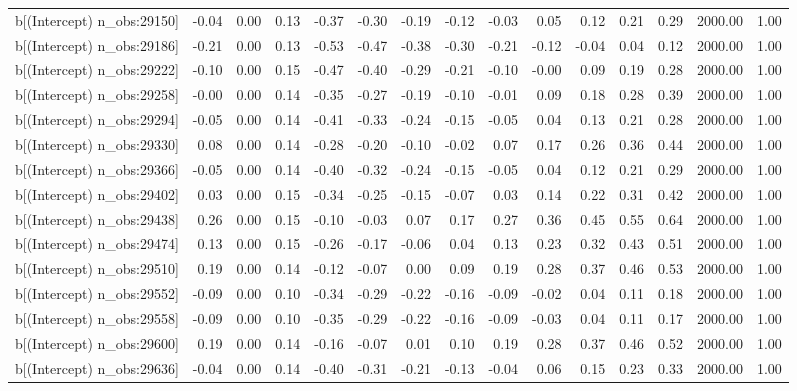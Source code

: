 \begin{table}[ht]
\begin{tabular}{rrrrrrrrrrrrrrr}
  b[(Intercept) n\_obs:29150] & -0.04 & 0.00 & 0.13 & -0.37 & -0.30 & -0.19 & -0.12 & -0.03 & 0.05 & 0.12 & 0.21 & 0.29 & 2000.00 & 1.00 \\ 
  b[(Intercept) n\_obs:29186] & -0.21 & 0.00 & 0.13 & -0.53 & -0.47 & -0.38 & -0.30 & -0.21 & -0.12 & -0.04 & 0.04 & 0.12 & 2000.00 & 1.00 \\ 
  b[(Intercept) n\_obs:29222] & -0.10 & 0.00 & 0.15 & -0.47 & -0.40 & -0.29 & -0.21 & -0.10 & -0.00 & 0.09 & 0.19 & 0.28 & 2000.00 & 1.00 \\ 
  b[(Intercept) n\_obs:29258] & -0.00 & 0.00 & 0.14 & -0.35 & -0.27 & -0.19 & -0.10 & -0.01 & 0.09 & 0.18 & 0.28 & 0.39 & 2000.00 & 1.00 \\ 
  b[(Intercept) n\_obs:29294] & -0.05 & 0.00 & 0.14 & -0.41 & -0.33 & -0.24 & -0.15 & -0.05 & 0.04 & 0.13 & 0.21 & 0.28 & 2000.00 & 1.00 \\ 
  b[(Intercept) n\_obs:29330] & 0.08 & 0.00 & 0.14 & -0.28 & -0.20 & -0.10 & -0.02 & 0.07 & 0.17 & 0.26 & 0.36 & 0.44 & 2000.00 & 1.00 \\ 
  b[(Intercept) n\_obs:29366] & -0.05 & 0.00 & 0.14 & -0.40 & -0.32 & -0.24 & -0.15 & -0.05 & 0.04 & 0.12 & 0.21 & 0.29 & 2000.00 & 1.00 \\ 
  b[(Intercept) n\_obs:29402] & 0.03 & 0.00 & 0.15 & -0.34 & -0.25 & -0.15 & -0.07 & 0.03 & 0.14 & 0.22 & 0.31 & 0.42 & 2000.00 & 1.00 \\ 
  b[(Intercept) n\_obs:29438] & 0.26 & 0.00 & 0.15 & -0.10 & -0.03 & 0.07 & 0.17 & 0.27 & 0.36 & 0.45 & 0.55 & 0.64 & 2000.00 & 1.00 \\ 
  b[(Intercept) n\_obs:29474] & 0.13 & 0.00 & 0.15 & -0.26 & -0.17 & -0.06 & 0.04 & 0.13 & 0.23 & 0.32 & 0.43 & 0.51 & 2000.00 & 1.00 \\ 
  b[(Intercept) n\_obs:29510] & 0.19 & 0.00 & 0.14 & -0.12 & -0.07 & 0.00 & 0.09 & 0.19 & 0.28 & 0.37 & 0.46 & 0.53 & 2000.00 & 1.00 \\ 
  b[(Intercept) n\_obs:29552] & -0.09 & 0.00 & 0.10 & -0.34 & -0.29 & -0.22 & -0.16 & -0.09 & -0.02 & 0.04 & 0.11 & 0.18 & 2000.00 & 1.00 \\ 
  b[(Intercept) n\_obs:29558] & -0.09 & 0.00 & 0.10 & -0.35 & -0.29 & -0.22 & -0.16 & -0.09 & -0.03 & 0.04 & 0.11 & 0.17 & 2000.00 & 1.00 \\ 
  b[(Intercept) n\_obs:29600] & 0.19 & 0.00 & 0.14 & -0.16 & -0.07 & 0.01 & 0.10 & 0.19 & 0.28 & 0.37 & 0.46 & 0.52 & 2000.00 & 1.00 \\ 
  b[(Intercept) n\_obs:29636] & -0.04 & 0.00 & 0.14 & -0.40 & -0.31 & -0.21 & -0.13 & -0.04 & 0.06 & 0.15 & 0.23 & 0.33 & 2000.00 & 1.00 \\ 

\end{tabular}
\end{table}
